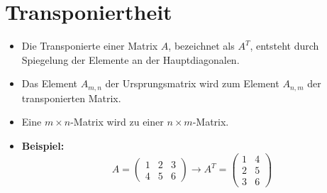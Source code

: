 \section{Transponiertheit}
\begin{itemize}
    \item Die Transponierte einer Matrix \(A\), bezeichnet als \(A^T\), entsteht durch Spiegelung der Elemente an der Hauptdiagonalen.
    \item Das Element \(A_{m,n}\) der Ursprungsmatrix wird zum Element \(A_{n,m}\) der transponierten Matrix.
    \item Eine \(m \times n\)-Matrix wird zu einer \(n \times m\)-Matrix.
    \item \textbf{Beispiel:}
    \[
    A = \begin{pmatrix}
        1 & 2 & 3 \\
        4 & 5 & 6
    \end{pmatrix}
    \rightarrow
    A^T = \begin{pmatrix}
        1 & 4 \\
        2 & 5 \\
        3 & 6
    \end{pmatrix}
    \]
\end{itemize}